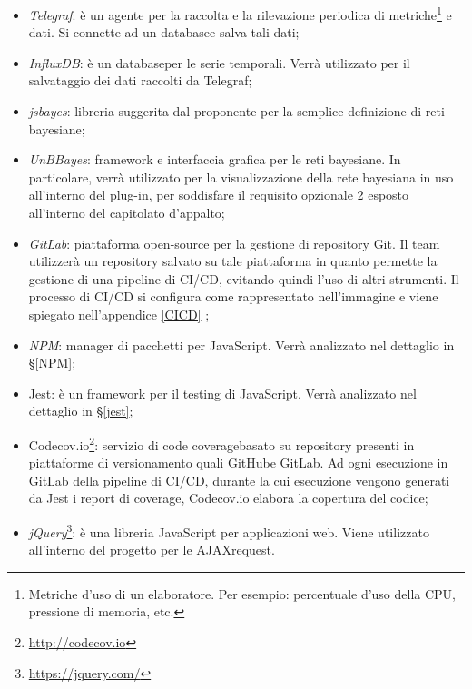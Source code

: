 \begin{itemize} 
	\item \textit{Telegraf}\glossario: è un agente per la raccolta e la rilevazione periodica di metriche\footnote{Metriche d'uso di un elaboratore. Per esempio: percentuale d'uso della CPU, pressione di memoria, etc.} e dati. Si connette ad un database\glossario e salva tali dati;
	\item \textit{InfluxDB}\glossario: è un database\glossario per le serie temporali. Verrà utilizzato per il salvataggio dei dati raccolti da Telegraf;
	\item \textit{jsbayes}\glossario: libreria suggerita dal proponente per la semplice definizione di reti bayesiane; 
	\item \textit{UnBBayes}\glossario: framework e interfaccia grafica per le reti bayesiane. In particolare, verrà utilizzato per la visualizzazione della rete bayesiana in uso all'interno del plug-in, per soddisfare il requisito opzionale 2 esposto all'interno del capitolato d'appalto;
	\item \textit{GitLab}\glossario: piattaforma open-source per la gestione di repository Git. Il team utilizzerà un repository salvato su tale piattaforma in quanto permette la gestione di una pipeline di CI/CD\glossario, evitando quindi l'uso di altri strumenti. Il processo di CI/CD si configura come rappresentato nell'immagine e viene spiegato nell'appendice \ref{CICD} ;
	\item \textit{NPM}\glossario: manager di pacchetti per JavaScript. Verrà analizzato nel dettaglio in §\ref{NPM};
	\item Jest\glossario: è un framework per il testing di JavaScript. Verrà analizzato nel dettaglio in §\ref{jest};
	\item Codecov.io\footnote{\url{http://codecov.io}}: servizio di code coverage\glossario basato su repository presenti in piattaforme di versionamento quali GitHub\glossario e GitLab. Ad ogni esecuzione in GitLab della pipeline di CI/CD, durante la cui esecuzione vengono generati da Jest i report di coverage, Codecov.io elabora la copertura del codice;
	\item \textit{jQuery}\glossario\footnote{\url{https://jquery.com/}}: è una libreria JavaScript per applicazioni web. Viene utilizzato all'interno del progetto per le  AJAX\glossario request.
\end{itemize}

